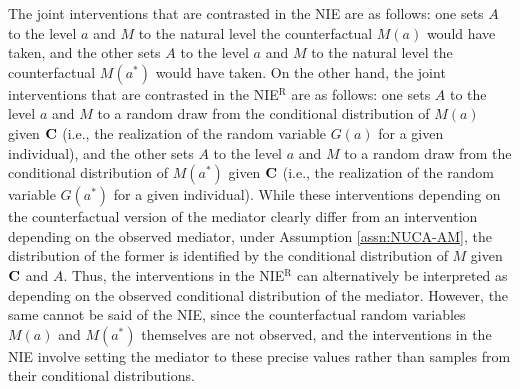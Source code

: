 \documentclass[12pt]{article}
\begin{document}
The joint interventions that are contrasted in the NIE are as follows: one sets $A$ to the level $a$ and $M$ to the natural level the counterfactual $M(a)$ would have taken, and the other sets $A$ to the level $a$ and $M$ to the natural level the counterfactual $M(a^*)$ would have taken. On the other hand, the joint interventions that are contrasted in the NIE$^{\text{R}}$ are as follows: one sets $A$ to the level $a$ and $M$ to a random draw from the conditional distribution of $M(a)$ given ${\bf C}$ (i.e., the realization of the random variable $G(a)$ for a given individual), and the other sets $A$ to the level $a$ and $M$ to a random draw from the conditional distribution of $M(a^*)$ given ${\bf C}$ (i.e., the realization of the random variable $G(a^*)$ for a given individual). %
While these interventions depending on the counterfactual version of the mediator clearly differ from an intervention depending on the observed mediator, under Assumption \ref{assn:NUCA-AM}, the distribution of the former is identified by the conditional distribution of $M$ given ${\bf C}$ and $A$. Thus, the interventions in the NIE$^{\text{R}}$ can alternatively be interpreted as depending on the observed conditional distribution of the mediator. However, the same cannot be said of the NIE, since the counterfactual random variables $M(a)$ and $M(a^*)$ themselves are not observed, and the interventions in the NIE involve setting the mediator to these precise values rather than samples from their conditional distributions.
\end{document}
